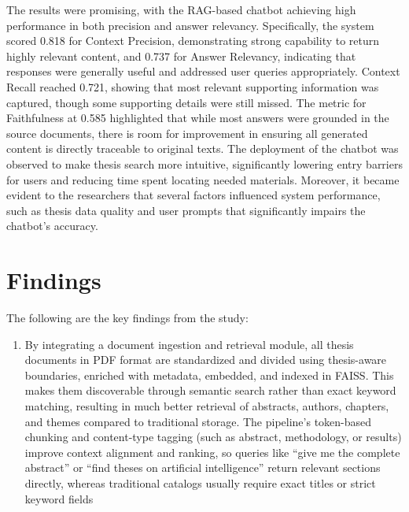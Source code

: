 \begin{refsection}
The results were promising, with the RAG-based chatbot achieving high performance in both precision and answer relevancy. Specifically, the system scored 0.818 for Context Precision, demonstrating strong capability to return highly relevant content, and 0.737 for Answer Relevancy, indicating that responses were generally useful and addressed user queries appropriately. Context Recall reached 0.721, showing that most relevant supporting information was captured, though some supporting details were still missed. The metric for Faithfulness at 0.585 highlighted that while most answers were grounded in the source documents, there is room for improvement in ensuring all generated content is directly traceable to original texts. The deployment of the chatbot was observed to make thesis search more intuitive, significantly lowering entry barriers for users and reducing time spent locating needed materials. Moreover, it became evident to the researchers that several factors influenced system performance, such as thesis data quality and user prompts that significantly impairs the chatbot's accuracy.

\section*{Findings}

The following are the key findings from the study:

\begin{enumerate}
    \item By integrating a document ingestion and retrieval module, all thesis documents in PDF format are standardized and divided using thesis-aware boundaries, enriched with metadata, embedded, and indexed in FAISS. This makes them discoverable through semantic search rather than exact keyword matching, resulting in much better retrieval of abstracts, authors, chapters, and themes compared to traditional storage. The pipeline’s token-based chunking and content-type tagging (such as abstract, methodology, or results) improve context alignment and ranking, so queries like “give me the complete abstract” or “find theses on artificial intelligence” return relevant sections directly, whereas traditional catalogs usually require exact titles or strict keyword fields


\end{enumerate}
\end{refsection}
